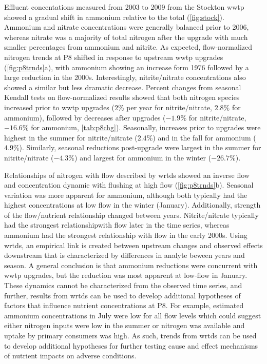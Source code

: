 \documentclass[journal = esthag, manuscript = article]{achemso}\usepackage[]{graphicx}\usepackage[]{color}
\begin{document}
Effluent concentations measured from 2003 to 2009 from the Stockton \ac{wwtp} showed a gradual shift in ammonium relative to the total (\cref{fig:stock}).  Ammonium and nitrate concentrations were generally balanced prior to 2006, whereas nitrate was a majority of total nitrogen after the upgrade with much smaller percentages from ammonium and nitrite. As expected, flow-normalized nitrogen trends at P8 shifted in response to upstream \ac{wwtp} upgrades (\cref{fig:p8trnds}a), with ammonium showing an increase form 1976 followed by a large reduction in the 2000s.  Interestingly, nitrite/nitrate concentrations also showed a similar but less dramatic decrease.  Percent changes from seasonal Kendall tests on flow-normalized results showed that both nitrogen species increased prior to \ac{wwtp} upgrades ($2$\% per year for nitrite/nitrate, $2.8$\% for ammonium), followed by decreases after upgrades ($-1.9$\% for nitrite/nitrate, $-16.6$\% for ammonium, \cref{tab:p8chg}).  Seasonally, increases prior to upgrades were highest in the summer for nitrite/nitrate ($2.4$\%) and in the fall for ammonium ($4.9$\%). Similarly, seasonal reductions post-upgrade were largest in the summer for nitrite/nitrate ($-4.3$\%) and largest for ammonium in the winter ($-26.7$\%).

Relationships of nitrogen with flow described by \ac{wrtds} showed an inverse flow and concentration dynamic with flushing at high flow (\cref{fig:p8trnds}b).  Seasonal variation was more apparent for ammonium, although both typically had the highest concentrations at low flow in the winter (January).  Additionally, strength of the flow/nutrient relationship changed between years. Nitrite/nitrate typically had the strongest relationshipwith flow later in the time series, whereas ammonium had the strongest relationship with flow in the early 2000s.  Using \ac{wrtds}, an empirical link is created between upstream changes and observed effects downstream that is characterized by differences in analyte beween years and season. A general conclusion is that ammonium reductions were concurrent with \ac{wwtp} upgrades, but the reduction was most apparent at low-flow in January.  These dynamics cannot be characterized from the observed time series, and further, results from \ac{wrtds} can be used to develop additional hypotheses of factors that influence nutrient concentrations at P8.  For example, estimated ammonium concentrations in July were low for all flow levels which could suggest either nitrogen inputs were low in the summer or nitrogen was available and uptake by primary consumers was high.  As such, trends from \ac{wrtds} can be used to develop additional hypotheses for further testing cause and effect mechanisms of nutrient impacts on adverse conditions.  
\end{document}

